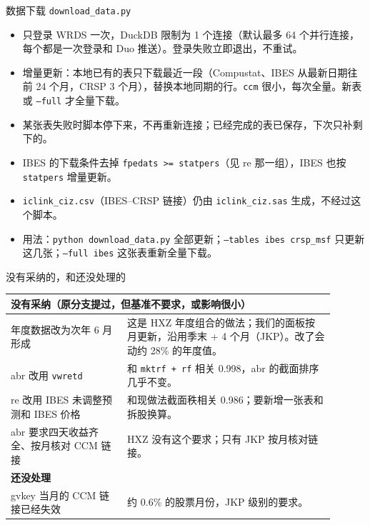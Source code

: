\documentclass[UTF8,fontset=fandol,aspectratio=169,10pt,t]{ctexbeamer}
\newcommand{\code}[1]{\texttt{#1}}
\newcommand{\tsize}{\small}
\begin{document}
\begin{frame}{数据下载 \code{download\_data.py}}
\begin{itemize}
\item 只登录 WRDS 一次，DuckDB 限制为 1 个连接（默认最多 64 个并行连接，每个都是一次登录和 Duo 推送）。登录失败立即退出，不重试。
\item 增量更新：本地已有的表只下载最近一段（Compustat、IBES 从最新日期往前 24 个月，CRSP 3 个月），替换本地同期的行。\code{ccm} 很小，每次全量。新表或 \code{--full} 才全量下载。
\item 某张表失败时脚本停下来，不再重新连接；已经完成的表已保存，下次只补剩下的。
\item IBES 的下载条件去掉 \code{fpedats >= statpers}（见 re 那一组），IBES 也按 \code{statpers} 增量更新。
\item \code{iclink\_ciz.csv}（IBES--CRSP 链接）仍由 \code{iclink\_ciz.sas} 生成，不经过这个脚本。
\item 用法：\code{python download\_data.py} 全部更新；\code{--tables ibes crsp\_msf} 只更新这几张；\code{--full ibes} 这张表重新全量下载。
\end{itemize}
\end{frame}

\begin{frame}{没有采纳的，和还没处理的}
{\tsize
\begin{tabular}{p{0.32\linewidth} p{0.58\linewidth}}
\toprule
\multicolumn{2}{l}{\textbf{没有采纳}（原分支提过，但基准不要求，或影响很小）} \\
\midrule
年度数据改为次年 6 月形成 & 这是 HXZ 年度组合的做法；我们的面板按月更新，沿用季末 + 4 个月（JKP）。改了会动约 28\% 的年度值。 \\
abr 改用 \code{vwretd} & 和 \code{mktrf + rf} 相关 0.998，abr 的截面排序几乎不变。 \\
re 改用 IBES 未调整预测和 IBES 价格 & 和现做法截面秩相关 0.986；要新增一张表和拆股换算。 \\
abr 要求四天收益齐全、按月核对 CCM 链接 & HXZ 没有这个要求；只有 JKP 按月核对链接。 \\
\midrule
\multicolumn{2}{l}{\textbf{还没处理}} \\
\midrule
gvkey 当月的 CCM 链接已经失效 & 约 0.6\% 的股票月份，JKP 级别的要求。 \\
\bottomrule
\end{tabular}}
\end{frame}
\end{document}
